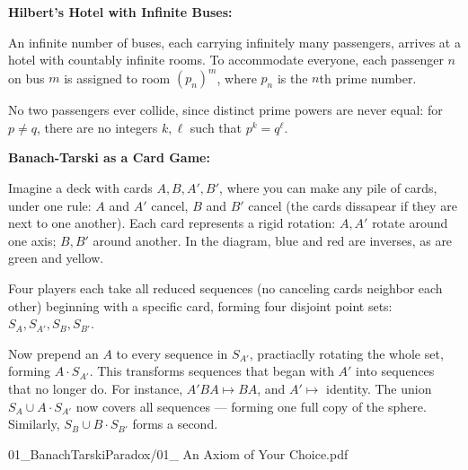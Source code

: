 \begin{SideNotePage}{
  \textbf{Hilbert’s Hotel with Infinite Buses:} \par
  An infinite number of buses, each carrying infinitely many passengers, arrives at a hotel with countably infinite rooms. To accommodate everyone, each passenger \(n\) on bus \(m\) is assigned to room \((p_n)^m\), where \(p_n\) is the \(n\)th prime number. 

  \vspace{0.5em}
  No two passengers ever collide, since distinct prime powers are never equal: for \(p \ne q\), there are no integers \(k, \ell\) such that \(p^k = q^\ell\).

  \vspace{1.5em}
  \textbf{Banach-Tarski as a Card Game:} \par
  Imagine a deck with cards \(A, B, A', B'\), where you can make any pile of cards, under one rule: $A$ and $A'$ cancel, $B$ and $B'$ cancel (the cards dissapear if they are next to one another). Each card represents a rigid rotation: \(A, A'\) rotate around one axis; \(B, B'\) around another. In the diagram, blue and red are inverses, as are green and yellow.

  \vspace{0.5em}
  Four players each take all reduced sequences (no canceling cards neighbor each other) beginning with a specific card, forming four disjoint point sets: \(S_A, S_{A'}, S_B, S_{B'}\).

  \vspace{0.5em}
  Now prepend an \(A\) to every sequence in \(S_{A'}\), practiaclly rotating the whole set, forming \(A \cdot S_{A'}\). This transforms sequences that began with \(A'\) into sequences that no longer do. For instance, \(A'BA \mapsto BA\), and \(A' \mapsto\) identity. The union \(S_A \cup A \cdot S_{A'}\) now covers all sequences — forming one full copy of the sphere. Similarly, \(S_B \cup B \cdot S_{B'}\) forms a second.

}{01_BanachTarskiParadox/01_ An Axiom of Your Choice.pdf}
\end{SideNotePage}
